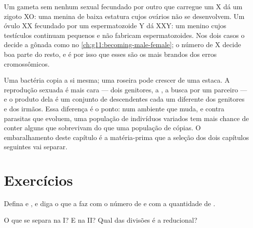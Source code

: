 \begin{example}\label{ex:g12:meiosis-genetic-shuffling:sexchrom}
Um gameta sem nenhum  sexual fecundado por outro que carregue
um X dá um zigoto XO: uma menina de baixa estatura cujos ovários não se
desenvolvem. Um óvulo XX fecundado por um espermatozoide Y dá XXY: um
menino cujos testículos continuam pequenos e não fabricam
espermatozoides. Nos dois casos o  decide a gônada como no
\cref{ch:g11:becoming-male-female}; o número de  X decide
boa parte do resto, e é por isso que esses são os mais brandos dos
erros cromossômicos.
\end{example}

\begin{remark}\label{rem:g12:meiosis-genetic-shuffling:whysex}
Uma bactéria copia a si mesma; uma roseira pode crescer de uma estaca.
A reprodução sexuada é mais cara --- dois genitores, a , a busca
por um parceiro --- e o produto dela é um conjunto de descendentes cada
um diferente dos genitores e dos irmãos. Essa diferença é o ponto: num
ambiente que muda, e contra parasitas que evoluem, uma população de
indivíduos variados tem mais chance de conter alguns que sobrevivam do
que uma população de cópias. O embaralhamento deste capítulo é a
matéria-prima que a seleção dos dois capítulos seguintes vai separar.
\end{remark}

\section{Exercícios}

\begin{exercise}[$\star$]\label{exo:g12:meiosis-genetic-shuffling:1}
Defina  e , e diga o que a  faz com o número de
 e com a quantidade de .
\end{exercise}

\begin{exercise}[$\star$]\label{exo:g12:meiosis-genetic-shuffling:2}
O que se separa na  I? E na  II? Qual das divisões é a
reducional?
\end{exercise}

